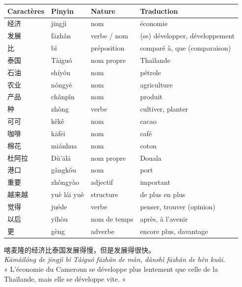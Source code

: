 \documentclass[11pt]{article}
\begin{document}
\begin{definition}
\begin{center}
\begin{tabularx}{\linewidth}{|X|X|X|X|}
\hline
\rowcolor{popblueL} Caractères & Pinyin & Nature & Traduction \\
\hline
经济 & jīngjì & nom & économie \\
\hline
发展 & fāzhǎn & verbe / nom & (se) développer, développement \\
\hline
比 & bǐ & préposition & comparé à, que (comparaison) \\
\hline
泰国 & Tàiguó & nom propre & Thaïlande \\
\hline
石油 & shíyóu & nom & pétrole \\
\hline
农业 & nóngyè & nom & agriculture \\
\hline
产品 & chǎnpǐn & nom & produit \\
\hline
种 & zhòng & verbe & cultiver, planter \\
\hline
可可 & kěkě & nom & cacao \\
\hline
咖啡 & kāfēi & nom & café \\
\hline
棉花 & miánhua & nom & coton \\
\hline
杜阿拉 & Dù'ālā & nom propre & Douala \\
\hline
港口 & gǎngkǒu & nom & port \\
\hline
重要 & zhòngyào & adjectif & important \\
\hline
越来越 & yuè lái yuè & structure & de plus en plus \\
\hline
觉得 & juéde & verbe & penser, trouver (opinion) \\
\hline
以后 & yǐhòu & nom de temps & après, à l'avenir \\
\hline
更 & gèng & adverbe & encore plus, davantage \\
\hline
\end{tabularx}
\end{center}
\end{definition}

\begin{textebox}
喀麦隆的经济比泰国发展得慢，但是发展得很快。\\
\emph{Kāmàilóng de jīngjì bǐ Tàiguó fāzhǎn de màn, dànshì fāzhǎn de hěn kuài.}\\
« L'économie du Cameroun se développe plus lentement que celle de la Thaïlande, mais elle se développe vite. »
\end{textebox}
\end{document}
